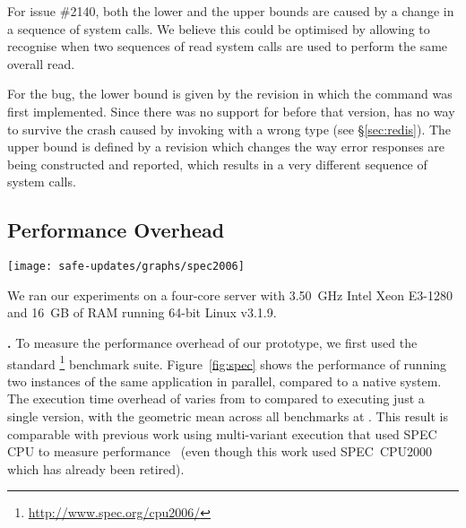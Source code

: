 For \lighttpd issue \#2140, both the lower and the upper bounds are
caused by a change in a sequence of  system calls.  We
believe this could be optimised by allowing \mx to recognise when two
sequences of read system calls are used to perform the same overall
read.


For the \redis bug, the lower bound is given by the revision in which the
 command was first implemented.  Since there was no support for
 before that version, \mx has no way to survive the crash caused
by invoking  with a wrong type (see \S\ref{sec:redis}).  The
upper bound is defined by a revision which changes the way error responses are
being constructed and reported, which results in a very different sequence of
system calls.



\subsection{Performance Overhead}
\label{sec:performance}

\begin{figure*}[!t]
\centering
\texttt{[image: safe-updates/graphs/spec2006]}
\caption{Normalised execution times for the \spec benchmark suite running under
\mx.}
\label{fig:spec}
\end{figure*}

We ran our experiments on a four-core server with 3.50~GHz Intel
Xeon E3-1280 and 16~GB of RAM running 64-bit Linux v3.1.9.

\textbf{\spec.}
To measure the performance overhead of our prototype, we first used
the standard \spec\footnote{\url{http://www.spec.org/cpu2006/}}
benchmark suite.  Figure~\ref{fig:spec} shows the performance of \mx
running two instances of the same application in parallel, compared to
a native system. The execution time overhead of \mx varies
from \minOverSPEC to \maxOverSPEC compared to executing just a single
version, with the geometric mean across all \numSPECbench benchmarks at
\avgOverSPEC. This result is comparable with previous work using multi-variant
execution that used SPEC CPU to measure performance~\cite{orchestra09} (even
though this work used SPEC~CPU2000 which has already been retired).

